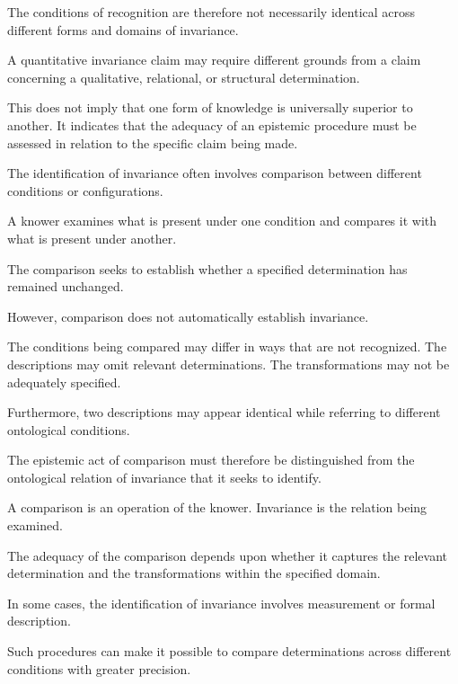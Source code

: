 The conditions of recognition
are therefore not necessarily
identical across different forms
and domains of invariance.

A quantitative invariance claim
may require different grounds
from a claim concerning a
qualitative, relational, or
structural determination.

This does not imply that one
form of knowledge is universally
superior to another. It indicates
that the adequacy of an epistemic
procedure must be assessed in
relation to the specific claim
being made.


The identification of invariance
often involves comparison between
different conditions or configurations.

A knower examines what is present
under one condition and compares
it with what is present under
another.

The comparison seeks to establish
whether a specified determination
has remained unchanged.

However, comparison does not
automatically establish invariance.

The conditions being compared
may differ in ways that are not
recognized. The descriptions
may omit relevant determinations.
The transformations may not be
adequately specified.

Furthermore, two descriptions
may appear identical while
referring to different ontological
conditions.

The epistemic act of comparison
must therefore be distinguished
from the ontological relation
of invariance that it seeks
to identify.

A comparison is an operation
of the knower. Invariance is
the relation being examined.

The adequacy of the comparison
depends upon whether it captures
the relevant determination and
the transformations within
the specified domain.


In some cases, the identification
of invariance involves measurement
or formal description.

Such procedures can make it
possible to compare determinations
across different conditions
with greater precision.

